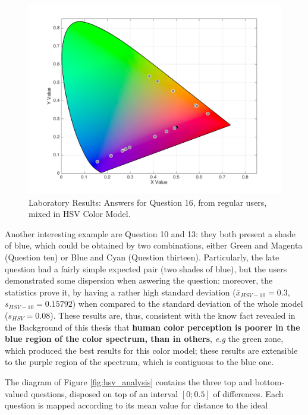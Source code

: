 \begin{enumerate}
\begin{figure}[!htbp]
\begin{minipage}{0.48\textwidth}
      \includegraphics[width=\textwidth]{images/results/16_lab_HSVresponses.png}
      \caption[Laboratory Results: Answers for Question 16, from regular users, mixed in HSV Color Model.]{Laboratory Results: Answers for Question 16, from regular users, mixed in HSV Color Model.}
      \label{fig:labhsvregular_16}
    \end{minipage}
  \end{figure}
\end{enumerate} \par
%
Another interesting example are Question 10 and 13: they both present a shade of blue, which could be obtained by two combinations, either Green and Magenta (Question ten) or Blue and Cyan (Question thirteen). Particularly, the
late question had a fairly simple expected pair (two shades of blue), but the users demonstrated some dispersion when aswering the question: moreover, the statistics prove it, by having a rather high standard deviation
($\overline{x}_{HSV-10} = 0.3$, $s_{HSV-10} = 0.15792$) when compared to the standard deviation of the whole model ($s_{HSV} = 0.08$). These results are, thus, consistent with the know fact revealed in the Background of this thesis that
\textbf{human color perception is poorer in the blue region of the color spectrum, than in others}, \emph{e.g} the green zone, which produced the best results for this color model; these results are extensible to the purple region
of the spectrum, which is contiguous to the blue one. \par
%
The diagram of Figure \ref{fig:hsv_analysis} contains the three top and bottom-valued questions, disposed on top of an interval $[0 ; 0.5]$ of differences. Each question is mapped according to its mean value for distance to the ideal
